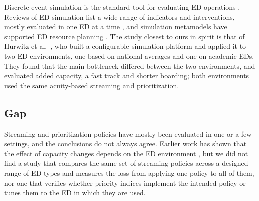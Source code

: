 Discrete-event simulation is the standard tool for evaluating ED operations \cite{Gul2015_SimInED,Saghafian2015}. Reviews of ED simulation list a wide range of indicators and interventions, mostly evaluated in one ED at a time \cite{VANBRABANT2019356_Simulation_of_ED}, and simulation metamodels have supported ED resource planning \cite{ZEINALI2015123}. The study closest to ours in spirit is that of Hurwitz et al.\ \cite{Hurwitz2014_FlexibleEDSim}, who built a configurable simulation platform and applied it to two ED environments, one based on national averages and one on academic EDs. They found that the main bottleneck differed between the two environments, and evaluated added capacity, a fast track and shorter boarding; both environments used the same acuity-based streaming and prioritization.

\subsection{Gap}

Streaming and prioritization policies have mostly been evaluated in one or a few settings, and the conclusions do not always agree. Earlier work has shown that the effect of capacity changes depends on the ED environment \cite{Hurwitz2014_FlexibleEDSim}, but we did not find a study that compares the same set of streaming policies across a designed range of ED types and measures the loss from applying one policy to all of them, nor one that verifies whether priority indices implement the intended policy or tunes them to the ED in which they are used.
